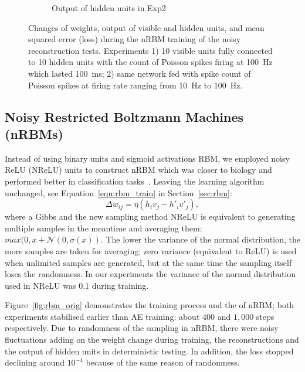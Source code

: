 \begin{figure}
\begin{subfigure}[t]{0.45\textwidth}
		\caption{Output of hidden units in Exp2}
	\end{subfigure}
	\caption{Changes of weights, output of visible and hidden units, and mean squared error (loss) during the nRBM training of the noisy reconstruction tests. 
		Experiments 1) 10 visible units fully connected to 10 hidden units with the count of Poisson spikes firing at 100~Hz which lasted 100~ms; 2) \protect{} same network fed with spike count of Poisson spikes at firing rate ranging from 10~Hz to 100~Hz.}
	\label{fig:rbm_noise}
\end{figure}

\subsection{Noisy Restricted Boltzmann Machines (nRBMs)}
Instead of using binary units and sigmoid activations \protect{} \protect{} RBM, we employed noisy ReLU (NReLU) units to construct \protect{} nRBM which was closer to biology and performed better in classification tasks~\citep{nair2010rectified}.
Leaving the learning algorithm unchanged, see Equation~\ref{equ:rbm_train} in Section~\ref{sec:rbm}:
\begin{equation}
\Delta w_{ij} = \eta (h_iv_j - h'_iv'_j),
\label{equ:rbm}
\end{equation} 
where \protect{} a \protect{} Gibbs \protect{} \protect{} and the new sampling method NReLU is equivalent to generating multiple samples in the meantime and averaging them: $max(0, x+\mathcal{N}(0, \sigma(x))$.
The lower the variance of the normal distribution, the more samples are taken for averaging;
zero variance (equivalent to ReLU) is used when unlimited samples are generated, but at the same time the sampling itself loses the randomness.
In our experiments the variance of the normal distribution used in NReLU was 0.1 during training.


Figure~\ref{fig:rbm_orig} demonstrates the training process and the \protect{} \protect{} of \protect{} nRBM; both experiments stabilised earlier than AE training: about 400 and $1,000$ steps respectively.
Due to \protect{} randomness of the sampling in \protect{} nRBM, there were noisy fluctuations adding on the weight change during training, the reconstructions and the output of hidden units in deterministic testing.
In addition, the loss stopped declining around $10^{-4}$ because of the same reason of randomness.

